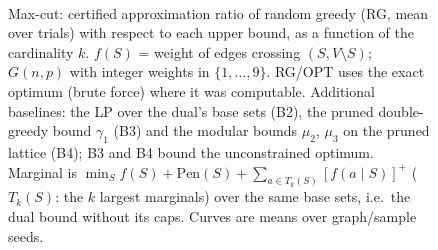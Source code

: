 \begin{figure}[t]
\centering
\setlength{\rgplotwidth}{0.49\columnwidth}
\\[1pt]

\caption{Max-cut: certified approximation ratio of random greedy (RG, mean over trials) with respect to each upper bound, as a function of the cardinality $k$. $f(S)$ = weight of edges crossing $(S, V\setminus S)$; $G(n,p)$ with integer weights in $\{1,\dots,9\}$. RG/OPT uses the exact optimum (brute force) where it was computable. Additional baselines: the LP over the dual's base sets (B2), the pruned double-greedy bound $\gamma_1$ (B3) and the modular bounds $\mu_2$, $\mu_3$ on the pruned lattice (B4); B3 and B4 bound the unconstrained optimum. Marginal is $\min_S f(S)+\mathrm{Pen}(S)+\sum_{a\in T_k(S)}[f(a\mid S)]^+$ ($T_k(S)$: the $k$ largest marginals) over the same base sets, i.e.\ the dual bound without its caps. Curves are means over graph/sample seeds.}
\label{fig:rg-max_cut-baselines}
\end{figure}
